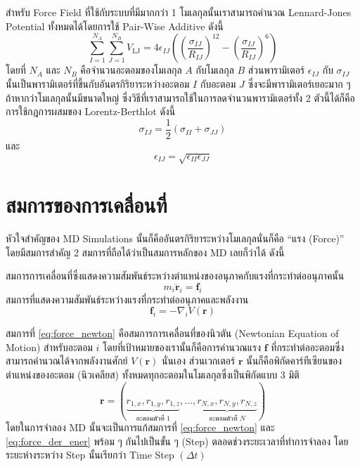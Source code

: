 สำหรับ Force Field ที่ใช้กับระบบที่มีมากกว่า 1 โมเลกุลนั้นเราสามารถคำนวณ Lennard-Jones Potential ทั้งหมดได้โดยการใช้ Pair-Wise Additive ดังนี้
%
\begin{equation}
  \sum^{N_{A}}_{I=1}
  \sum^{N_{B}}_{J=1}
  V_{\text{LJ}}
  =
  4 \epsilon_{IJ}
  \left(
  \left(
    \frac{\sigma_{IJ}}{R_{IJ}}
    \right)^{12}
  -
  \left(
    \frac{\sigma_{IJ}}{R_{IJ}}
    \right)^{6}
  \right)
\end{equation}
%
โดยที่ $N_{A}$ และ $N_{B}$ คือจำนวนอะตอมของโมเลกุล $A$ กับโมเลกุล $B$ ส่วนพารามิเตอร์ $\epsilon_{IJ}$ กับ $\sigma_{IJ}$ นั้นเป็นพารามิเตอร์ที่ขึ้นกับอันตรกิริยาระหว่างอะตอม $I$ กับอะตอม $J$ ซึ่งจะมีพารามิเตอร์เยอะมาก ๆ ถ้าหากว่าโมเลกุลนั้นมีขนาดใหญ่ ซึ่งวิธีที่เราสามารถใช้ในการลดจำนวนพารามิเตอร์ทั้ง 2 ตัวนี้ได้ก็คือการใช้กฎการผสมของ Lorentz-Berthlot ดังนี้
%
\begin{equation}
  \sigma_{IJ}
  =
  \frac{1}{2}
  (\sigma_{II}
  + \sigma_{JJ})
\end{equation}
%
และ
%
\begin{equation}
  \epsilon_{IJ}
  =
  \sqrt{\epsilon_{II} \epsilon_{JJ}}
\end{equation}

\section{สมการของการเคลื่อนที่}

หัวใจสำคัญของ MD Simulations นั้นก็คืออันตรกิริยาระหว่างโมเลกุลนั่นก็คือ \enquote{แรง (Force)} โดยมีสมการสำคัญ 2 สมการที่ถือได้ว่าเป็นสมการหลักของ MD เลยก็ว่าได้ ดังนี้

\noindent สมการการเคลื่อนที่ซึ่งแสดงความสัมพันธ์ระหว่างตำแหน่งของอนุภาคกับแรงที่กระทำต่ออนุภาคนั้น
%
\begin{equation}
  \label{eq:force_newton}
  m_{i}\bm{\ddot{r}}_{i} 
  = 
  \bm{f}_{i}
\end{equation}
%
สมการที่แสดงความสัมพันธ์ระหว่างแรงที่กระทำต่ออนุภาคและพลังงาน
%
\begin{equation}
  \label{eq:force_der_ener}
  \bm{f}_{i} 
  = 
  -\nabla_{i}V(\bm{r})
\end{equation}

สมการที่ \ref{eq:force_newton} คือสมการการเคลื่อนที่ของนิวตัน (Newtonian Equation of Motion) สำหรับอะตอม $i$ โดยที่เป้าหมายของเรานั้นก็คือการคำนวณแรง $\bm{f}$ ที่กระทำต่ออะตอมซึ่งสามารถคำนวณได้จากพลังงานศักย์ $V(\bm{r})$ นั่นเอง ส่วนเวกเตอร์ $\bm{r}$ นั้นก็คือพิกัดคาร์ทีเซียนของตำแหน่งของอะตอม (นิวเคลียส) ทั้งหมดทุกอะตอมในโมเลกุลซึ่งเป็นพิกัดแบบ 3 มิติ
%
\begin{equation}
  \bm{r} = (\underbrace{r_{1,x}, r_{1,y}, r_{1,z}}_{\text{อะตอมตัวที่ 1}}, \dots,
  \underbrace{r_{N,x}, r_{N,y}, r_{N,z}}_{\text{อะตอมตัวที่ $N$}})
\end{equation}
%
โดยในการจำลอง MD นั้นจะเป็นการแก้สมการที่ \eqref{eq:force_newton} และ \eqref{eq:force_der_ener} พร้อม ๆ กันไปเป็นขั้น ๆ (Step) ตลอดช่วงระยะเวลาที่ทำการจำลอง โดยระยะห่างระหว่าง Step นั้นเรียกว่า Time Step $(\Delta t)$

